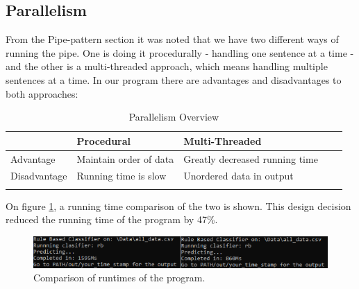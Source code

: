 \subsection{Parallelism} \label{parallelism}
From the Pipe-pattern section it was noted that we have two different ways of running the pipe. One is doing it procedurally - handling one sentence at a time - and the other is a multi-threaded approach, which means handling multiple sentences at a time. In our program there are advantages and disadvantages to both approaches:

\begin{table}[H]
	\centering
	\begin{tabular}{@{}lllll@{}}
		\toprule
		& Procedural             & Multi-Threaded                  &  &  \\ \midrule
		Advantage    & Maintain order of data & Greatly decreased running time &  &  \\
		Disadvantage & Running time is slow   & Unordered data in output       &  &  \\
		&                        &                                 &  &  \\ \bottomrule
	\end{tabular}
	\caption{Parallelism Overview}
	\label{parallel}
\end{table}

On figure \ref{multiprog}, a running time comparison of the two is shown. This design decision reduced the running time of the program by 47\%. 

\begin{figure}[H]
	\includegraphics[width=\textwidth]{Images/MultithreadProgram}
	\centering
	\caption{Comparison of runtimes of the program.}
	\label{multiprog}
\end{figure}

